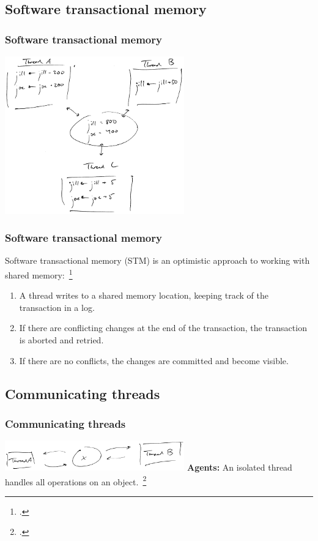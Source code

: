 \documentclass[aspectratio=1610]{beamer}
\begin{document}
  \subsection{Software transactional memory}

  \begin{frame}
    \frametitle{Software transactional memory}
    \centering

    \includegraphics[width=220pt]{../figures/stm}
  \end{frame}

  \begin{frame}
    \frametitle{Software transactional memory}

    Software transactional memory (STM) is an optimistic approach to working with shared memory:~\footcite{Shavit1995}

    \begin{enumerate}
      \item A thread writes to a shared memory location, keeping track of the transaction in a log.
      \item If there are conflicting changes at the end of the transaction, the transaction is aborted and retried.
      \item If there are no conflicts, the changes are committed and become visible.
    \end{enumerate}
  \end{frame}

  \subsection{Communicating threads}

  \begin{frame}
    \frametitle{Communicating threads}
    \centering

    \includegraphics[width=220pt]{../figures/agent}
    \vfill
    \textbf{Agents:} An isolated thread handles all operations on an object.~\footcite{Swalens2014}
  \end{frame}
\end{document}
